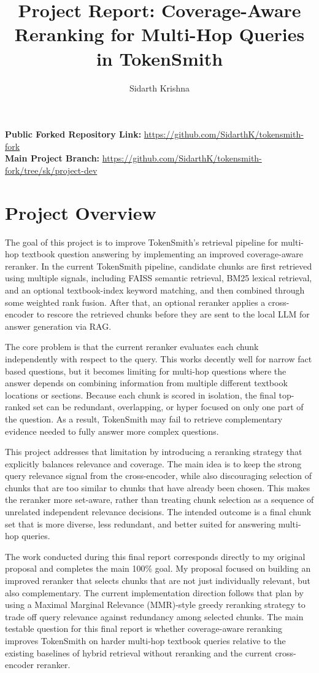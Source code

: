 \documentclass[sigconf]{acmart}
\title{Project Report: Coverage-Aware Reranking for Multi-Hop Queries in TokenSmith}
\author{Sidarth Krishna}
\affiliation{%
  \institution{Georgia Institute of Technology}
  \city{Atlanta}
  \state{Georgia}
  \country{USA}}
\begin{document}
\maketitle

\noindent\textbf{Public Forked Repository Link:} \url{https://github.com/SidarthK/tokensmith-fork} \\
\textbf{Main Project Branch:} \url{https://github.com/SidarthK/tokensmith-fork/tree/sk/project-dev}

\section{Project Overview}
The goal of this project is to improve TokenSmith’s retrieval pipeline for multi-hop textbook question answering by implementing an improved coverage-aware reranker. In the current TokenSmith pipeline, candidate chunks are first retrieved using multiple signals, including FAISS semantic retrieval, BM25 lexical retrieval, and an optional textbook-index keyword matching, and then combined through some weighted rank fusion. After that, an optional reranker applies a cross-encoder to rescore the retrieved chunks before they are sent to the local LLM for answer generation via RAG.

The core problem is that the current reranker evaluates each chunk independently with respect to the query. This works decently well for narrow fact based questions, but it becomes limiting for multi-hop questions where the answer depends on combining information from multiple different textbook locations or sections. Because each chunk is scored in isolation, the final top-ranked set can be redundant, overlapping, or hyper focused on only one part of the question. As a result, TokenSmith may fail to retrieve complementary evidence needed to fully answer more complex questions.

This project addresses that limitation by introducing a reranking strategy that explicitly balances relevance and coverage. The main idea is to keep the strong query relevance signal from the cross-encoder, while also discouraging selection of chunks that are too similar to chunks that have already been chosen. This makes the reranker more set-aware, rather than treating chunk selection as a sequence of unrelated independent relevance decisions. The intended outcome is a final chunk set that is more diverse, less redundant, and better suited for answering multi-hop queries.

The work conducted during this final report corresponds directly to my original proposal and completes the main 100\% goal. My proposal focused on building an improved reranker that selects chunks that are not just individually relevant, but also complementary. The current implementation direction follows that plan by using a Maximal Marginal Relevance (MMR)-style greedy reranking strategy to trade off query relevance against redundancy among selected chunks. The main testable question for this final report is whether coverage-aware reranking improves TokenSmith on harder multi-hop textbook queries relative to the existing baselines of hybrid retrieval without reranking and the current cross-encoder reranker.
\end{document}
